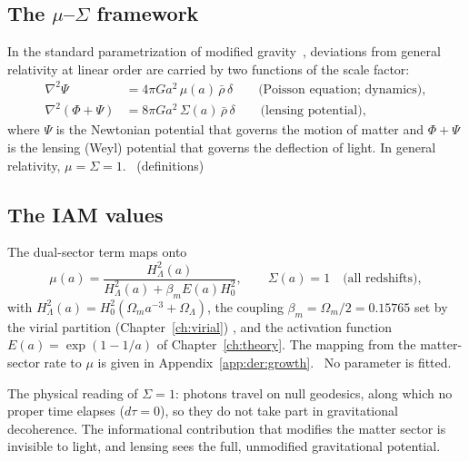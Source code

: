 \subsection{The $\mu$--$\Sigma$ framework}
In the standard parametrization of modified gravity~\cite{PogosianSilvestri2016,Amendola2008}, deviations from general relativity at linear order
are carried by two functions of the scale factor:
\begin{align}
\nabla^2\Psi&=4\pi Ga^2\,\mu(a)\,\bar\rho\,\delta\qquad\text{(Poisson equation; dynamics)},\label{eq:ld_poisson}\\
\nabla^2(\Phi+\Psi)&=8\pi Ga^2\,\Sigma(a)\,\bar\rho\,\delta\qquad\text{(lensing potential)},\label{eq:ld_lens}
\end{align}
where $\Psi$ is the Newtonian potential that governs the motion of matter and $\Phi+\Psi$ is the lensing (Weyl) potential that governs the
deflection of light. In general relativity, $\mu=\Sigma=1$. \derived\ (definitions)

\subsection{The IAM values}
The dual-sector term maps onto
\begin{equation}
\mu(a)=\frac{H^2_\Lambda(a)}{H^2_\Lambda(a)+\beta_mE(a)H_0^2},\qquad\Sigma(a)=1\quad\text{(all redshifts)},
\label{eq:ld_mu}\end{equation}
with $H^2_\Lambda(a)=H_0^2(\Omega_ma^{-3}+\Omega_\Lambda)$, the coupling $\beta_m=\Omega_m/2=0.15765$ set by the virial partition
(Chapter~\ref{ch:virial}) \prediction, and the activation function $E(a)=\exp(1-1/a)$ of Chapter~\ref{ch:theory}. The mapping from the matter-sector
rate to $\mu$ is given in Appendix~\ref{app:der:growth}. \interp\ No parameter is fitted.

The physical reading of $\Sigma=1$: photons travel on null geodesics, along which no proper time elapses ($d\tau=0$), so they do not take part in
gravitational decoherence. The informational contribution that modifies the matter sector is invisible to light, and lensing sees the full,
unmodified gravitational potential. \interp

